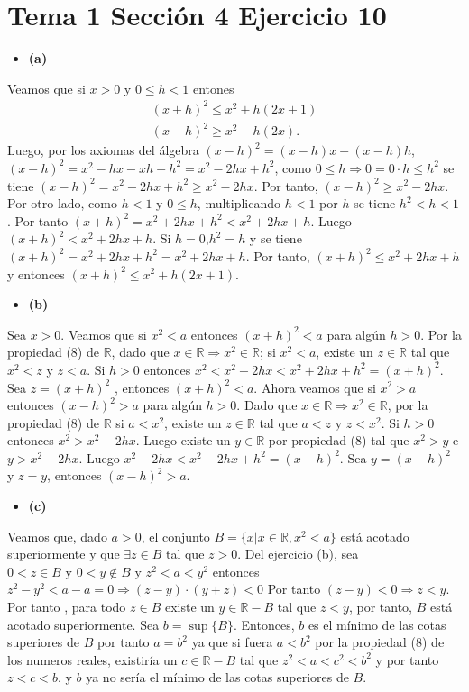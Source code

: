 \documentclass{article}
\begin{document}
\section{Tema 1 Sección 4 Ejercicio 10}
\begin{itemize}
\item \bf (a) \rm
\end{itemize}
Veamos que si $x>0$ y $0\leq h <1$ entones
\begin{eqnarray}
(x+h)^2\leq x^2+h(2x+1) \nonumber\\
(x-h)^2\geq x^2-h(2x).\nonumber
\end{eqnarray}
Luego, por los axiomas del álgebra $(x-h)^2=(x-h)x-(x-h)h$,  $(x-h)^2=x^2-hx-xh+h^2=x^2-2hx+h^2$, como $0\leq h\Rightarrow 0=0\cdot h\leq h^2$  se tiene $(x-h)^2=x^2-2hx+h^2\geq x^2-2hx$. Por tanto, $(x-h)^2\geq x^2-2hx$. Por otro lado, como $h<1$ y $0\leq h$, multiplicando $h<1$ por $h$ se tiene $h^2<h<1$. Por tanto $(x+h)^2=x^2+2hx+h^2<x^2+2hx+h$. Luego $(x+h)^2<x^2+2hx+h$. Si $h=0$,$h^2=h$ y se tiene $(x+h)^2=x^2+2hx+h^2= x^2+2hx+h$. Por tanto, $(x+h)^2\leq x^2+2hx+h$ y entonces $(x+h)^2\leq x^2+h(2x+1)$.
\begin{itemize}
\item \bf (b) \rm
\end{itemize}
Sea $x>0$. Veamos que si $x^2<a$
entonces $(x+h)^2<a$ para algún $h>0$. Por la propiedad (8) de $\mathbb{R}$, dado que $x\in\mathbb{R}\Rightarrow x^2\in\mathbb{R}$; si $x^2<a$, existe un $z\in\mathbb{R}$ tal que $x^2<z$ y $z<a$. Si $h>0$ entonces $x^2<x^2+2hx< x^2+2hx+h^2=(x+h)^2$. Sea $z=(x+h)^2$ , entonces $(x+h)^2<a$. Ahora veamos que si $x^2>a$ entonces $(x-h)^2>a$ para algún $h>0$. Dado que $x\in\mathbb{R}\Rightarrow x^2\in\mathbb{R}$, por la propiedad (8) de $\mathbb{R}$ si $a<x^2$, existe un $z\in\mathbb{R}$ tal que $a<z$ y $z<x^2$. Si $h>0$ entonces $x^2>x^2-2hx$. Luego existe un $y\in\mathbb{R}$ por propiedad (8) tal que  $x^2>y$ e $y>x^2-2hx$. Luego $x^2-2hx<x^2-2hx+h^2=(x-h)^2$. Sea $y=(x-h)^2$ y $z=y$, entonces $(x-h)^2>a$.
\begin{itemize}
\item \bf (c) \rm
\end{itemize}
Veamos que, dado $a>0$, el conjunto $B=\{x|x\in \mathbb{R}, x^2<a\}$ está acotado superiormente y que $\exists z\in B$ tal que $z>0$. Del ejercicio (b), sea $0<z\in B\text{ y }0<y\notin B$ y $z^2<a< y^2$ entonces $z^2-y^2<a-a=0 \Rightarrow (z-y)\cdot (y+z)<0$ Por tanto $(z-y)<0\Rightarrow z<y$. Por tanto , para todo $z\in B$ existe un $y\in \mathbb{R}-B$ tal que $z<y$, por tanto, $B$ está acotado superiormente. Sea $b=\sup \{B\}$. Entonces, $b$ es el mínimo de las cotas superiores de $B$ por tanto $a = b^2$ ya que si fuera $a<b^2$ por la propiedad (8) de los numeros reales, existiría un $c\in \mathbb{R}-B$ tal que $z^2<a<c^2<b^2$ y por tanto $z<c<b$. y $b$ ya no sería el mínimo de las cotas superiores de   $B$.
\end{document}

